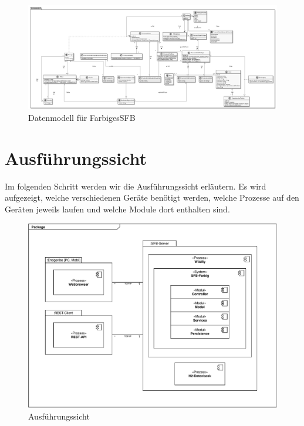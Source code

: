 \documentclass[enabledeprecatedfontcommands,fontsize=12pt,paper=a4,twoside]{scrartcl}
\begin{document}
{ \begin{figure}
   \includegraphics[width=\textwidth]{UML/datenModel}
  \caption{Datenmodell für FarbigesSFB}
  \centering
 

 \end{figure}
\newpage
\section{Ausführungssicht}

\label{sec:ausfuehrung}


{ Im folgenden Schritt werden wir die Ausführungssicht erläutern. Es wird aufgezeigt, welche verschiedenen Geräte benötigt werden, welche Prozesse auf den Geräten jeweils laufen und welche Module dort enthalten sind.
}


\begin{figure}[H]
\includegraphics[width=\textwidth]{UML/06Ausfuehrungssicht.pdf}
 \caption{Ausführungssicht}
\end{figure}


}
\end{document}
